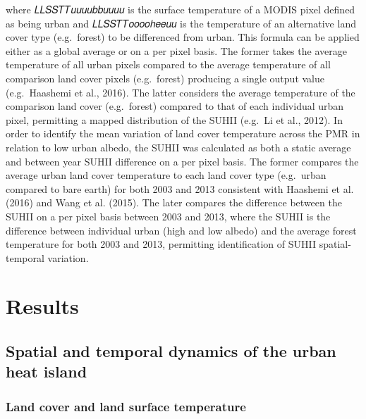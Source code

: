 \documentclass[]{book}
\begin{document}
where 𝐿𝐿𝑆𝑆𝑇𝑇𝑢𝑢𝑢𝑢𝑏𝑏𝑢𝑢𝑢𝑢 is the surface temperature of a MODIS pixel
defined as being urban and 𝐿𝐿𝑆𝑆𝑇𝑇𝑜𝑜𝑜𝑜ℎ𝑒𝑒𝑢𝑢 is the temperature of an
alternative land cover type (e.g.~forest) to be differenced from urban.
This formula can be applied either as a global average or on a per pixel
basis. The former takes the average temperature of all urban pixels
compared to the average temperature of all comparison land cover pixels
(e.g.~forest) producing a single output value (e.g.~Haashemi et al.,
2016). The latter considers the average temperature of the comparison
land cover (e.g.~forest) compared to that of each individual urban
pixel, permitting a mapped distribution of the SUHII (e.g.~Li et al.,
2012). In order to identify the mean variation of land cover temperature
across the PMR in relation to low urban albedo, the SUHII was calculated
as both a static average and between year SUHII difference on a per
pixel basis. The former compares the average urban land cover
temperature to each land cover type (e.g.~urban compared to bare earth)
for both 2003 and 2013 consistent with Haashemi et al. (2016) and Wang
et al. (2015). The later compares the difference between the SUHII on a
per pixel basis between 2003 and 2013, where the SUHII is the difference
between individual urban (high and low albedo) and the average forest
temperature for both 2003 and 2013, permitting identification of SUHII
spatial-temporal variation.

\section{Results}\label{results-2}

\subsection{Spatial and temporal dynamics of the urban heat
island}\label{spatial-and-temporal-dynamics-of-the-urban-heat-island}

\subsubsection{Land cover and land surface
temperature}\label{land-cover-and-land-surface-temperature}
\end{document}

